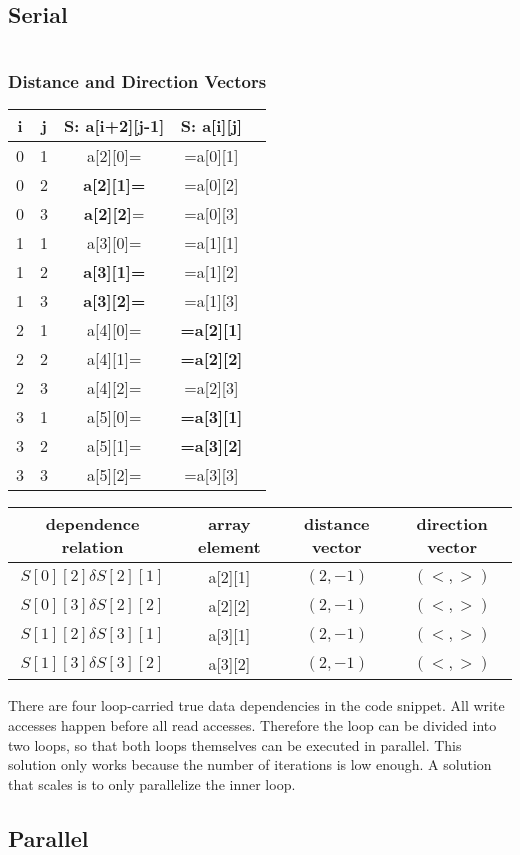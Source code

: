 \documentclass[parskip]{scrartcl}
\begin{document}
	\subsection{Serial}
	\inputminted	[linenos]{c}{ex3/serial.c}
	\subsubsection{Distance and Direction Vectors}
	\begin{tabular}{|c|c|c|c|c|}
		\hline i & j & S: a[i+2][j-1] & S: a[i][j]\\
		\hline 0 & 1 & a[2][0]= & =a[0][1]\\
		\hline 0 & 2 & \textbf{a[2][1]=} & =a[0][2]\\
		\hline 0 & 3 & \textbf{a[2][2]}= & =a[0][3]\\
		\hline 1 & 1 & a[3][0]= & =a[1][1]\\
		\hline 1 & 2 & \textbf{a[3][1]=} & =a[1][2]\\
		\hline 1 & 3 & \textbf{a[3][2]=} & =a[1][3]\\
		\hline 2 & 1 & a[4][0]= & \textbf{=a[2][1]}\\
		\hline 2 & 2 & a[4][1]= & \textbf{=a[2][2]}\\
		\hline 2 & 3 & a[4][2]= & =a[2][3]\\		
		\hline 3 & 1 & a[5][0]= & \textbf{=a[3][1]}\\
		\hline 3 & 2 & a[5][1]= & \textbf{=a[3][2]}\\
		\hline 3 & 3 & a[5][2]= & =a[3][3]\\
		\hline
	\end{tabular}
	
	\begin{tabular}{|c|c|c|c|}
		\hline dependence relation & array element & distance vector & direction vector\\
		\hline $S[0][2]\delta S[2][1]$ & a[2][1] & $(2,-1)$ & $(<,>)$\\
		\hline $S[0][3]\delta S[2][2]$ & a[2][2] & $(2,-1)$ & $(<,>)$\\
		\hline $S[1][2]\delta S[3][1]$ & a[3][1] & $(2,-1)$ & $(<,>)$\\
		\hline $S[1][3]\delta S[3][2]$ & a[3][2] & $(2,-1)$ & $(<,>)$\\
		\hline
	\end{tabular}
	
	There are four loop-carried true data dependencies in the code snippet. All write accesses happen before all read accesses. Therefore the loop can be divided into two loops, so that both loops themselves can be executed in parallel. This solution only works because the number of iterations is low enough. A solution that scales is to only parallelize the inner loop.
	\subsection{Parallel}
	\inputminted	[linenos]{c}{ex3/parallel.c}
\end{document}
